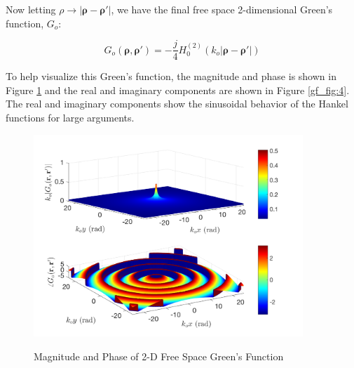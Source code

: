Now letting $\rho \rightarrow |\boldsymbol{\rho}-\boldsymbol{\rho}'|$, we have the final free space 2-dimensional Green's function, $G_o$:

\begin{equation}
\boxed{G_o\left(\boldsymbol{\rho},\boldsymbol{\rho}'\right) = -\frac{j}{4}H_0^{(2)}\left(k_o|\boldsymbol{\rho} - \boldsymbol{\rho}' | \right)}
\label{gf_eq:40}
\end{equation}
\renewcommand{\baselinestretch}{2} \small\normalsize

To help visualize this Green's function, the magnitude and phase is shown in Figure \ref{gf_fig:3} and the real and imaginary components are shown in Figure \ref{gf_fig:4}. The real and imaginary components show the sinusoidal behavior of the Hankel functions for large arguments.

\begin{figure}[ht]
\begin{center}
\includegraphics[width=4in]{../media/2d_fs_gf_mag.png}
\end{center}
\renewcommand{\baselinestretch}{1}
\small\normalsize
\begin{quote}
\caption[Magnitude and Phase of 2-D Free Space Green's Function]{Magnitude and Phase of 2-D Free Space Green's Function \label{gf_fig:3}}
\end{quote}
\end{figure} 
\renewcommand{\baselinestretch}{2}
\small\normalsize

